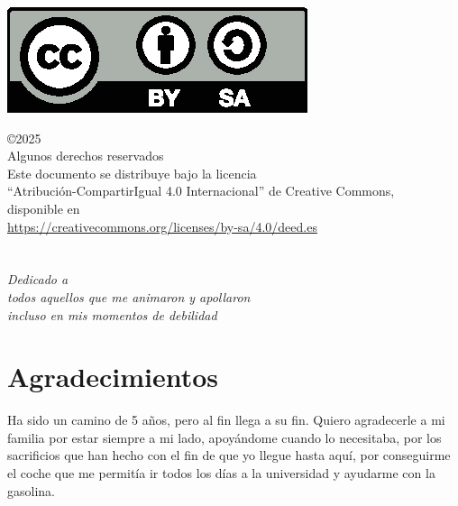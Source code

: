 \documentclass[a4paper, 12pt]{book}
\makeatletter
\let\theauthor\@author
\makeatother
\begin{document}
\begin{flushright}
	\includegraphics[scale=0.6]{img/by-sa}

	\noindent©2025 \theauthor  \\
	Algunos derechos reservados  \\
	Este documento se distribuye bajo la licencia \\
	``Atribución-CompartirIgual 4.0 Internacional'' de Creative Commons, \\
	disponible en \\
	\url{https://creativecommons.org/licenses/by-sa/4.0/deed.es}
\end{flushright}


\chapter*{}
\begin{flushright}
	\textit{Dedicado a \\
		todos aquellos que me animaron y apollaron \\
		incluso en mis momentos de debilidad}
\end{flushright}


\chapter*{Agradecimientos}
Ha sido un camino de 5 años, pero al fin llega a su fin. Quiero agradecerle a mi familia por estar siempre a mi lado, apoyándome cuando lo necesitaba, por los sacrificios que han hecho con el fin de que yo llegue hasta aquí, por conseguirme el coche que me permitía ir todos los días a la universidad y ayudarme con la gasolina. 
\end{document}

